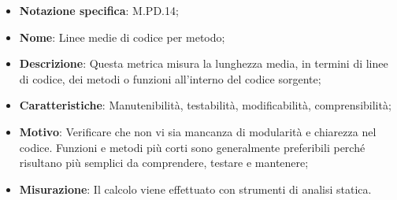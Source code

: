 \begin{itemize}
    \item \textbf{Notazione specifica}: M.PD.14;
    \item \textbf{Nome}: Linee medie di codice per metodo;
    \item \textbf{Descrizione}: Questa metrica misura la lunghezza media, in termini di linee di codice, dei metodi o funzioni all'interno del codice sorgente;
    \item \textbf{Caratteristiche}: Manutenibilità, testabilità, modificabilità, comprensibilità;
    \item \textbf{Motivo}: Verificare che non vi sia mancanza di modularità e chiarezza nel codice. Funzioni e metodi più corti sono generalmente preferibili perché risultano più semplici da comprendere, testare e mantenere; 
    \item \textbf{Misurazione}: Il calcolo viene effettuato con strumenti di analisi statica.
\end{itemize}
